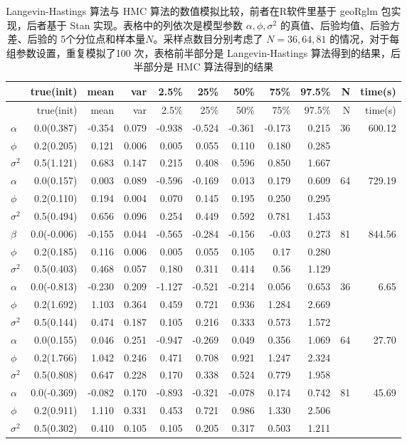 \documentclass[12pt,a4paper,UTF8,twoside]{book}
\theoremstyle{definition}
\theoremstyle{definition}
\theoremstyle{definition}
\theoremstyle{remark}
\begin{document}
\begin{longtable}[]{@{}lrrrrrrrrrr@{}}
\caption{\label{tab:MCLH-vs-NUTS} Langevin-Hastings 算法与 HMC
算法的数值模拟比较，前者在R软件里基于 geoRglm 包实现，后者基于 Stan
实现。表格中的列依次是模型参数 \(\alpha,\phi,\sigma^2\)
的真值、后验均值、后验方差、后验的
5个分位点和样本量\(N\)。采样点数目分别考虑了 \(N = 36, 64, 81\)
的情况，对于每组参数设置，重复模拟了100 次，表格前半部分是
Langevin-Hastings 算法得到的结果，后半部分是 HMC
算法得到的结果}\tabularnewline
\toprule
& true(init) & mean & var & 2.5\% & 25\% & 50\% & 75\% & 97.5\% & N &
time(s)\tabularnewline
\midrule
\endfirsthead
\toprule
& true(init) & mean & var & 2.5\% & 25\% & 50\% & 75\% & 97.5\% & N &
time(s)\tabularnewline
\midrule
\endhead
\(\alpha\) & 0.0(0.387) & -0.354 & 0.079 & -0.938 & -0.524 & -0.361 &
-0.173 & 0.215 & 36 & 600.12\tabularnewline
\(\phi\) & 0.2(0.205) & 0.121 & 0.006 & 0.005 & 0.055 & 0.110 & 0.180 &
0.285 & &\tabularnewline
\(\sigma^2\) & 0.5(1.121) & 0.683 & 0.147 & 0.215 & 0.408 & 0.596 &
0.850 & 1.667 & &\tabularnewline
\(\alpha\) & 0.0(0.157) & 0.003 & 0.089 & -0.596 & -0.169 & 0.013 &
0.179 & 0.609 & 64 & 729.19\tabularnewline
\(\phi\) & 0.2(0.110) & 0.194 & 0.004 & 0.070 & 0.145 & 0.195 & 0.250 &
0.295 & &\tabularnewline
\(\sigma^2\) & 0.5(0.494) & 0.656 & 0.096 & 0.254 & 0.449 & 0.592 &
0.781 & 1.453 & &\tabularnewline
\(\beta\) & 0.0(-0.006) & -0.155 & 0.044 & -0.565 & -0.284 & -0.156 &
-0.03 & 0.273 & 81 & 844.56\tabularnewline
\(\phi\) & 0.2(0.185) & 0.116 & 0.006 & 0.005 & 0.055 & 0.105 & 0.17 &
0.280 & &\tabularnewline
\(\sigma^2\) & 0.5(0.403) & 0.468 & 0.057 & 0.180 & 0.311 & 0.414 & 0.56
& 1.129 & &\tabularnewline
\(\alpha\) & 0.0(-0.813) & -0.230 & 0.209 & -1.127 & -0.521 & -0.214 &
0.056 & 0.653 & 36 & 6.65\tabularnewline
\(\phi\) & 0.2(1.692) & 1.103 & 0.364 & 0.459 & 0.721 & 0.936 & 1.284 &
2.669 & &\tabularnewline
\(\sigma^2\) & 0.5(0.144) & 0.474 & 0.187 & 0.105 & 0.216 & 0.333 &
0.573 & 1.572 & &\tabularnewline
\(\alpha\) & 0.0(0.155) & 0.046 & 0.251 & -0.947 & -0.269 & 0.049 &
0.356 & 1.069 & 64 & 27.70\tabularnewline
\(\phi\) & 0.2(1.766) & 1.042 & 0.246 & 0.471 & 0.708 & 0.921 & 1.247 &
2.324 & &\tabularnewline
\(\sigma^2\) & 0.5(0.808) & 0.647 & 0.228 & 0.170 & 0.338 & 0.524 &
0.779 & 1.958 & &\tabularnewline
\(\alpha\) & 0.0(-0.369) & -0.082 & 0.170 & -0.893 & -0.321 & -0.078 &
0.174 & 0.742 & 81 & 45.69\tabularnewline
\(\phi\) & 0.2(0.911) & 1.110 & 0.331 & 0.453 & 0.721 & 0.986 & 1.330 &
2.506 & &\tabularnewline
\(\sigma^2\) & 0.5(0.302) & 0.410 & 0.105 & 0.105 & 0.205 & 0.317 &
0.503 & 1.211 & &\tabularnewline
\bottomrule
\end{longtable}
\end{document}
